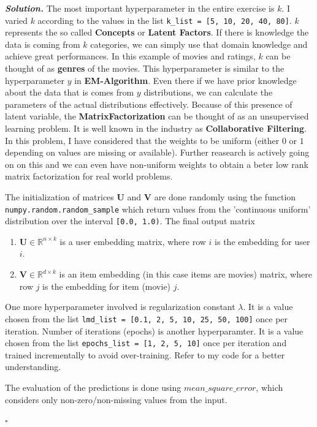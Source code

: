 \documentclass[10pt]{article}
\newenvironment{solution}[1][\it{Solution}]{\textbf{#1. } }{$\square$}
\begin{document}
\begin{solution}
The most important hyperparameter in the entire exercise is $k$. I varied $k$ according to the values in the list \texttt{k\_list = [5, 10, 20, 40, 80]}. $k$ represents the so called \textbf{Concepts} or \textbf{Latent Factors}. If there is knowledge the data is coming from $k$ categories, we can simply use that domain knowledge and achieve great performances. In this example of movies and ratings, $k$ can be thought of as \textbf{genres} of the movies. This hyperparameter is similar to the hyperparameter $y$ in \textbf{EM-Algorithm}. Even there if we have prior knowledge about the data that is comes from $y$ distributions, we can calculate the parameters of the actual distributions effectively. Because of this presence of latent variable, the \textbf{MatrixFactorization} can be thought of as an unsupervised learning problem. It is well known in the industry as \textbf{Collaborative Filtering}. In this problem, I have considered that the weights to be uniform (either $0$ or $1$ depending on values are missing or available). Further reasearch is actively going on on this and we can even have non-uniform weights\cite{nonuniform_mf} to obtain a beter low rank matrix factorization for real world problems.

The initialization of matrices \textbf{U} and \textbf{V} are done randomly using the function \texttt{numpy.random.random\_sample} which return values from the 'continuous uniform' distribution over the interval \texttt{[0.0, 1.0)}. The final output matrix

\begin{enumerate}
	\item $\mathbf{U} \in \mathbb{R}^{n \times k}$ is a user embedding matrix, where row $i$ is the embedding for user $i$.
	\item $\mathbf{V} \in \mathbb{R}^{d \times k}$ is an item embedding (in this case items are movies) matrix, where row $j$ is the embedding for item (movie) $j$.
\end{enumerate}

One more hyperparameter involved is regularization constant $\lambda$. It is a value chosen from the list \texttt{lmd\_list = [0.1, 2, 5, 10, 25, 50, 100]} once per iteration. Number of iterations (epochs) is another hyperparamter. It is a value chosen from the list \texttt{epochs\_list = [1, 2, 5, 10]} once per iteration and trained incrementally to avoid over-training. Refer to my code for a better understanding.

The evaluation of the predictions is done using $mean\_square\_error$, which considers only non-zero/non-missing values from the input.


\end{solution}
\end{document}
